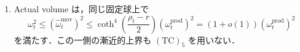 \begin{lemma}
\begin{enumerate}[label=\textup{(M\arabic*)}]
\begin{equation}\label{coarse:eq:moving-intrinsic-cusp-comparison}
 \omega_t^{\mathrm{prod}}
 \le\widehat\omega_t^{\mathrm{mov}}
 \le\coth^2\!\left(\frac{\rho_t-r}{2}\right)
                  \omega_t^{\mathrm{prod}}
 \quad\text{on }B_{g_t^{\mathrm{prod}}}(p_t,r)
\end{equation}
が成立する．Normalized holomorphic covering coordinates 上では，
全固定階 $C^k$ で $\widehat\omega_t^{\mathrm{mov}}-\omega_t^{\mathrm{prod}}\to0$ となる．
\item Actual volume は，同じ固定球上で
\begin{equation}\label{coarse:eq:moving-sharp-volume-upper}
 \omega_t^2
 \le\left(\widehat\omega_t^{\mathrm{mov}}\right)^2
 \le\coth^4\!\left(\frac{\rho_t-r}{2}\right)
                  (\omega_t^{\mathrm{prod}})^2
 =(1+o(1))(\omega_t^{\mathrm{prod}})^2
\end{equation}
を満たす．この一側の漸近的上界も $\mathrm{(TC)}_5$ を用いない．
\end{enumerate}
\end{lemma}

